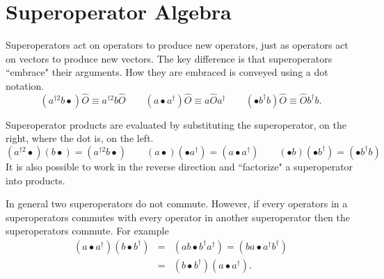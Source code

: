 %
\chapter{Superoperator Algebra}\label{Super Operator Algebra}
%
Superoperators act on operators to produce new operators, just as operators act on vectors to produce new vectors. The key difference is that superoperators ``embrace" their arguments. How they are embraced is conveyed using a dot notation.
\begin{equation}
\left( a^{\dagger 2} b \bullet \right) \hat{O} \equiv a^{\dagger 2} b \hat{O} \qquad \left(a \bullet a^{\dagger} \right) \hat{O} \equiv a \hat{O} a^{\dagger} \qquad \left( \bullet b^{\dagger} b \right) \hat{O} \equiv \hat{O} b^{\dagger} b.
\end{equation}

Superoperator products are evaluated by substituting the superoperator, on the right, where the dot is, on the left.
\begin{equation}
 \left( a^{\dagger 2} \bullet \right) \left( b \bullet \right) = \left( a^{\dagger 2} b \bullet \right) \qquad \left( a \bullet \right)\left( \bullet a^{\dagger} \right) = \left( a \bullet a^{\dagger} \right) \qquad \left( \bullet b \right) \left( \bullet b^{\dagger} \right) = \left( \bullet b^{\dagger} b \right)
\end{equation}
It is also possible to work in the reverse direction and ``factorize" a superoperator into products.

In general two superoperators do not commute. However, if every operators in a superoperators commutes with every operator in another superoperator then the superoperators commute. For example
\begin{eqnarray}
\left( a \bullet a^{\dagger} \right)\left( b \bullet b^{\dagger} \right) & = & \left( ab \bullet b^{\dagger} a^{\dagger} \right) = \left( b a \bullet a^{\dagger} b^{\dagger} \right) \nonumber \\
& = & \left( b \bullet b^{\dagger} \right) \left( a \bullet a^{\dagger} \right).
\end{eqnarray}

